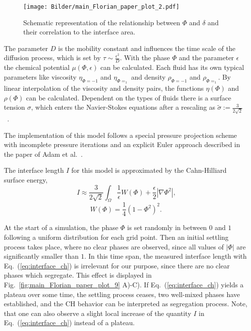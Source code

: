 \documentclass[10pt,letterpaper]{article}
\renewcommand{\eqref}[1]{Eq.~(\ref{eq:#1})}
\newcommand{\figref}[1]{Fig.~\ref{fig:#1}}
\begin{document}
\begin{figure}[ht!]
 \centering
 \texttt{[image: Bilder/main\_Florian\_paper\_plot\_2.pdf]}
 \caption{Schematic representation of the relationship between $\Phi$ and
 $\delta$ and their correlation to the interface area.}
 \label{fig:main_Florian_paper_plot_2}
\end{figure}

The parameter $D$ is the mobility constant and influences the time
scale of the diffusion process, which is set by $\tau \sim \frac{\epsilon^2}{D}$.
With the phase $\Phi$ and the
parameter $\epsilon$ the chemical potential $\mu(\Phi, \epsilon)$ can
be calculated. Each fluid has its own typical parameters like
viscosity $\eta_{\Phi=-1}$ and $\eta_{\Phi=_1}$ and density
$\rho_{\Phi=-1}$ and $\rho_{\Phi=_1}$. By linear interpolation of the
viscosity and density pairs, the functions $\eta(\Phi)$ and
$\rho(\Phi)$ can be calculated. Dependent on the types of fluids there
is a surface tension $\sigma$, which enters the Navier-Stokes equations
after a rescaling as
$\tilde{\sigma}:=\frac{3}{2{\sqrt{2}}}$~\cite{AlaBodHahKliWeiWel2013, AlaVoi2012}.

The implementation of this model follows a special pressure projection scheme
with incomplete pressure iterations and an explicit Euler approach described
in the paper of Adam et al.~\cite{AdaFraAla2020}.

The interface length $I$ for this model is approximated by the Cahn-Hilliard
surface energy,
%
\begin{equation}
    \label{eq:interface_ch}
    I\approx\frac{3}{2\sqrt{2}}\int_{\Omega}{\frac{1}{\epsilon}W(\Phi)+\frac{\epsilon}{2}|\nabla\Phi^2|}\text{,}
\end{equation}
\begin{equation}
    W(\Phi)=\frac{1}{4}(1-\Phi^2)^2\text{.}
\end{equation}

At the start of a simulation, the phase $\Phi$ is set randomly in between $0$ and $1$
following a uniform distribution for each grid point. Then an initial settling
process takes place, where no clear phases are observed, since all  values of
$|\Phi|$ are significantly smaller than $1$. In this time span, the measured interface
length with \eqref{interface_ch} is irrelevant for our purpose, since there are no clear
phases which segregate. This effect is displayed in \figref{main_Florian_paper_plot_9}
A)-C). If \eqref{interface_ch} yields a plateau over some time, the settling
process ceases, two well-mixed phases have established, and the CH behavior can
be interpreted as segregation process. Note, that one can also observe a slight
local increase of the quantity $I$ in \eqref{interface_ch} instead of a plateau.
\end{document}
